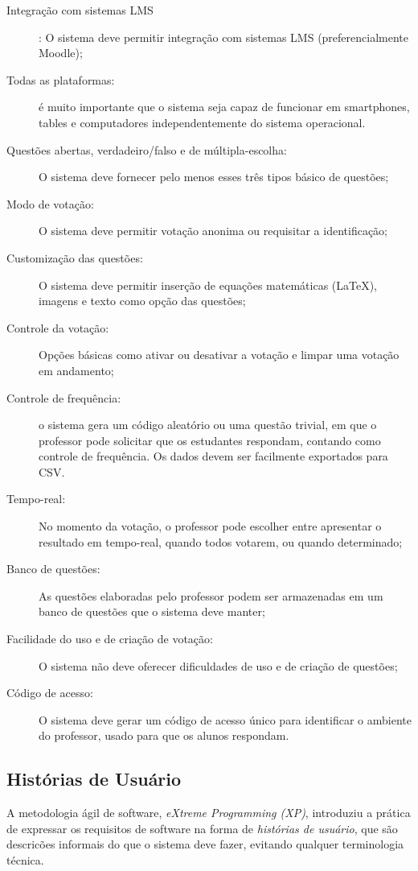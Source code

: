 \begin{description}
\item[Integração com sistemas LMS]: O sistema deve permitir integração com
sistemas LMS (preferencialmente Moodle);
\item[Todas as plataformas:] é muito importante que o sistema seja capaz
de funcionar em smartphones, tables e computadores independentemente
do sistema operacional.
\item[Questões abertas, verdadeiro/falso e de múltipla-escolha:] O sistema
deve fornecer pelo menos esses três tipos básico de questões;
\item[Modo de votação:] O sistema deve permitir votação anonima ou requisitar
a identificação;
\item[Customização das questões:] O sistema deve permitir inserção de equações
matemáticas (\LaTeX), imagens e texto como opção das questões;
\item[Controle da votação:] Opções básicas como ativar ou desativar a votação
e limpar uma votação em andamento;
\item[Controle de frequência:] o sistema gera um código aleatório ou uma
questão trivial, em que o professor pode solicitar que os estudantes
respondam, contando como controle de frequência. Os dados devem ser
facilmente exportados para CSV.
\item[Tempo-real:] No momento da votação, o professor pode escolher entre
apresentar o resultado em tempo-real, quando todos votarem, ou quando
determinado;
\item[Banco de questões:] As questões elaboradas pelo professor podem ser
armazenadas em um banco de questões que o sistema deve manter;
\item[Facilidade do uso e de criação de votação:] O sistema não deve oferecer
dificuldades de uso e de criação de questões;
\item[Código de acesso:] O sistema deve gerar um código de acesso único para
identificar o ambiente do professor, usado para que os alunos respondam.
\end{description}

\subsection{Histórias de Usuário}

A metodologia ágil de software, \textit{eXtreme Programming (XP)}, introduziu a
prática de expressar os requisitos de software na forma de \textit{histórias de usuário},
que são descricões informais do que o sistema deve fazer, evitando qualquer terminologia técnica.

